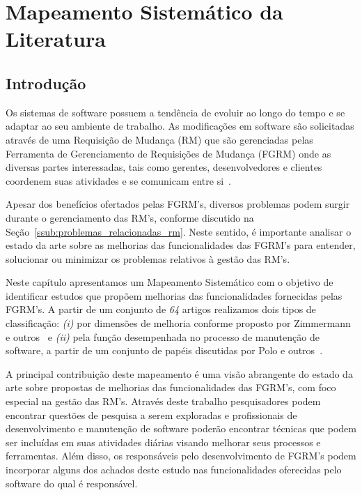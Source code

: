 
\chapter{Mapeamento Sistemático da Literatura}
\label{ch:mapeamento-sistematico}

\section{Introdução}
\label{sec:map-intro}

Os sistemas de software possuem a tendência de evoluir ao longo do tempo e se
adaptar ao seu ambiente de trabalho. As modificações em software são solicitadas
através de uma Requisição de Mudança (RM) que são gerenciadas pelas Ferramenta
de Ge\-ren\-ci\-a\-men\-to de Requisições de Mudança (FGRM) onde as diversas
partes interessadas, tais como gerentes, desenvolvedores e clientes coordenem
suas atividades e se comunicam entre si~\cite{bertram2010communication}.

Apesar dos benefícios ofertados pelas FGRM's, diversos problemas podem surgir
durante o gerenciamento das RM's, conforme discutido na
Seção~\ref{ssub:problemas_relacionadas_rm}. Neste sentido, é importante analisar
o estado da arte sobre as melhorias das fun\-ci\-o\-na\-li\-da\-des das FGRM's
para entender, solucionar ou minimizar os problemas relativos à gestão das RM's.

Neste capítulo apresentamos um Mapeamento Sistemático com o objetivo de
identificar estudos que propõem melhorias das funcionalidades fornecidas pelas
FGRM's. A partir de um conjunto de \textit{64} artigos realizamos dois tipos de
classificação: \textit{(i)} por dimensões de melhoria conforme proposto
por Zimmermann e outros~\cite{zimmermann2009improving} e \textit{(ii)} pela
função desempenhada no processo de manutenção de software, a partir de um
conjunto de papéis discutidas por Polo e outros~\cite{Polo1999}.

A principal contribuição deste mapeamento é uma visão abrangente do estado da
arte sobre propostas de melhorias das funcionalidades das FGRM's, com foco
especial na gestão das RM's. Através deste trabalho pesquisadores podem
encontrar questões de pesquisa a serem exploradas e profissionais de
desenvolvimento e manutenção de software poderão encontrar técnicas que podem
ser incluídas em suas atividades diárias visando melhorar seus processos e
ferramentas. Além disso, os responsáveis pelo desenvolvimento de FGRM's podem
incorporar alguns dos achados deste estudo nas funcionalidades oferecidas pelo
software do qual é responsável.

